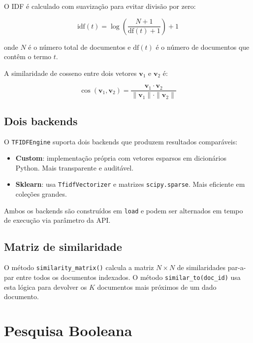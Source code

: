 \documentclass[12pt,a4paper]{article}
\begin{document}
O IDF é calculado com suavização para evitar divisão por zero:

\begin{equation}
    \mathrm{idf}(t) = \log\!\left(\frac{N+1}{\mathrm{df}(t)+1}\right) + 1
\end{equation}

onde $N$ é o número total de documentos e $\mathrm{df}(t)$ é o número de documentos que contêm o termo $t$.

A similaridade de cosseno entre dois vetores $\mathbf{v}_1$ e $\mathbf{v}_2$ é:

\begin{equation}
    \cos(\mathbf{v}_1, \mathbf{v}_2) = \frac{\mathbf{v}_1 \cdot \mathbf{v}_2}{\|\mathbf{v}_1\| \cdot \|\mathbf{v}_2\|}
\end{equation}

\subsection{Dois backends}

O \texttt{TFIDFEngine} suporta dois backends que produzem resultados comparáveis:

\begin{itemize}
    \item \textbf{Custom}: implementação própria com vetores esparsos em dicionários Python. Mais transparente e auditável.
    \item \textbf{Sklearn}: usa \texttt{TfidfVectorizer} e matrizes \texttt{scipy.sparse}. Mais eficiente em coleções grandes.
\end{itemize}

Ambos os backends são construídos em \texttt{load} e podem ser alternados em tempo de execução via parâmetro da API.

\subsection{Matriz de similaridade}

O método \texttt{similarity\_matrix()} calcula a matriz $N \times N$ de similaridades par-a-par entre todos os documentos indexados. O método \texttt{similar\_to(doc\_id)} usa esta lógica para devolver os $K$ documentos mais próximos de um dado documento.

\section{Pesquisa Booleana}
\end{document}
